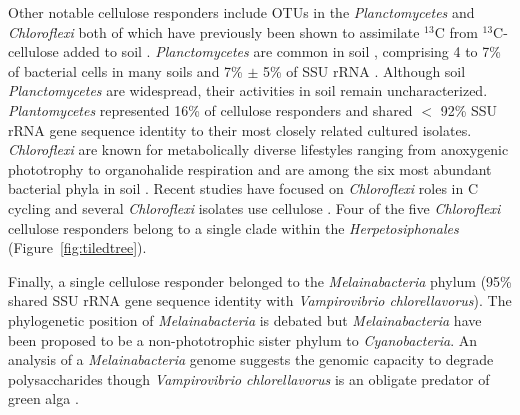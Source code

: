 Other notable cellulose responders include OTUs in the \textit{Planctomycetes}
and \textit{Chloroflexi} both of which have previously been shown to
assimilate $^{13}$C from $^{13}$C-cellulose added to soil
\citep{Schellenberger_2010}. \textit{Planctomycetes} are common in soil
\citep{Janssen2006}, comprising 4 to 7\% of bacterial cells in many soils
\citep{Zarda_1997,Chatzinotas_1998} and 7\% $\pm$ 5\% of SSU rRNA
\citep{buckley_2003}. Although soil \textit{Planctomycetes} are widespread,
their activities in soil remain uncharacterized. \textit{Plantomycetes}
represented 16\% of cellulose responders and shared $<$ 92\% SSU rRNA gene
sequence identity to their most closely related cultured isolates.
\textit{Chloroflexi} are known for metabolically diverse lifestyles ranging
from anoxygenic phototrophy to organohalide respiration \citep{Hug_2013} and
are among the six most abundant bacterial phyla in soil \citep{Janssen2006}.
Recent studies have focused on \textit{Chloroflexi} roles in C cycling
\citep{Hug_2013,Goldfarb_2011,Cole_2013} and several \textit{Chloroflexi}
isolates use cellulose \citep{Hug_2013,Goldfarb_2011,Cole_2013}. Four of the
five \textit{Chloroflexi} cellulose responders belong to a single clade within
the \textit{Herpetosiphonales} (Figure~\ref{fig:tiledtree}). 

Finally, a single cellulose responder belonged to the \textit{Melainabacteria}
phylum (95\% shared SSU rRNA gene sequence identity with \textit{Vampirovibrio
chlorellavorus}). The phylogenetic position of \textit{Melainabacteria} is
debated but \textit{Melainabacteria} have been proposed to be
a non-phototrophic sister phylum to \textit{Cyanobacteria}. An analysis of
a \textit{Melainabacteria} genome \citep{Di_Rienzi_2013} suggests the
genomic capacity to degrade polysaccharides though \textit{Vampirovibrio
chlorellavorus} is an obligate predator of green alga \citep{gromov_1972}.


